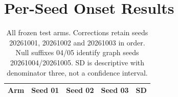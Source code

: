 \documentclass{llncs}
\begin{document}


\appendix
\section{Per-Seed Onset Results}
\begin{table}[h]
\caption{All frozen test arms. Corrections retain seeds 20261001, 20261002 and 20261003 in order. Null suffixes 04/05 identify graph seeds 20261004/20261005. SD is descriptive with denominator three, not a confidence interval.}
\centering\small
\begin{tabular}{lrrrr}
\toprule
Arm & Seed 01 & Seed 02 & Seed 03 & SD\\
\midrule

\bottomrule
\end{tabular}
\end{table}
\end{document}
